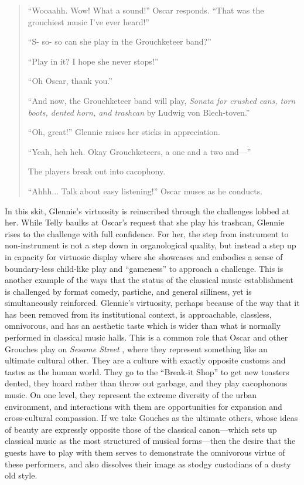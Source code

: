 \documentclass[12pt,letterpaper]{article}
\newcommand{\ses}{\textit{Sesame Street }}
\begin{document}
\begin{quote}
	``Wooaahh. Wow! What a sound!'' Oscar responds. ``That was the 
	grouchiest music I've ever heard!''

	``S- so- so can she play in the Grouchketeer band?''

	``Play in it? I hope she never stops!''

	``Oh Oscar, thank you.''

	``And now, the Grouchketeer band will play, \textit{Sonata for crushed 
	cans, torn boots, dented horn, and trashcan} by Ludwig von 
	Blech-toven.''

	``Oh, great!'' Glennie raises her sticks in appreciation.  

	``Yeah, heh heh. Okay Grouchketeers, a one and a two and---''

	The players break out into cacophony. 

	``Ahhh... Talk about easy listening!'' Oscar muses as he conducts. 

	\end{quote}

	In this skit, Glennie's virtuosity is reinscribed through the challenges
	lobbed at her. 
	While Telly baulks at Oscar's request that she play his trashcan,
	Glennie rises to 
	the challenge with full confidence. For her, the step from instrument to
	non-instrument is not a step down in organological quality, but instead
	a step up in capacity for virtuosic display where she showcases and
	embodies a sense of boundary-less child-like play and ``gameness'' to 
	approach a challenge. This is another example of
	the ways that the status of the classical music establishment is 
	challenged by format comedy, pastiche, and general silliness, yet is
	simultaneously reinforced. Glennie's virtuosity, perhaps because of the
	way that it has been removed from its institutional context, is  
	approachable, classless, omnivorous, and has an aesthetic 
	taste which is wider than what is normally performed in classical
	music halls. This is a common role that Oscar and other Grouches play
	on \ses, where they represent something like an ultimate cultural other.
	They are a culture with exactly opposite customs and tastes as the human
	world. They go to the ``Break-it Shop'' to get new toasters dented, 
	they hoard rather than throw out garbage, and they play cacophonous 
	music. On one level, they represent the extreme diversity of the urban 
	environment, and interactions with them are opportunities for expansion 
	and cross-cultural compassion. If we take Gouches as the ultimate 
	others, whose ideas of beauty are expressly opposite those of the 
	classical canon---which sets up classical music as the most structured
	 of musical forms---then the desire that the guests have to play with 
	them serves to demonstrate the omnivorous virtue of these performers,
	and also dissolves their image as stodgy custodians of a dusty old style.   
\end{document}
